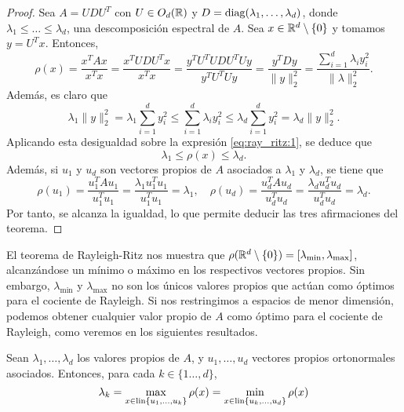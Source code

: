 \begin{proof}
    Sea $A = UDU^T$ con $U \in O_d(\mathbb{R})$ y $D = \operatorname{diag}(\lambda_1,\dots,\lambda_d)$, donde $\lambda_1 \le \dots \le \lambda_d$, una descomposición espectral de $A$. Sea $x \in \mathbb{R}^d \setminus \{0\}$ y tomamos $y = U^Tx$. Entonces,
    \begin{equation} \label{eq:ray_ritz:1}
        \rho(x) = \frac{x^TAx}{x^Tx} = \frac{x^TUDU^Tx}{x^Tx} = \frac{y^TU^TUDU^TUy}{y^TU^TUy} = \frac{y^TDy}{\|y\|^2_2} = \frac{\sum\limits_{i=1}^d \lambda_i y_i^2}{\|\lambda\|^2_2}. 
    \end{equation}
    Además, es claro que
    \[ \lambda_1\|y\|_2^2 = \lambda_1 \sum_{i=1}^d y_i^2 \le \sum_{i=1}^d \lambda_i y_i^2 \le \lambda_d \sum_{i=1}^d y_i^2 = \lambda_d\|y\|_2^2. \]
    Aplicando esta desigualdad sobre la expresión \ref{eq:ray_ritz:1}, se deduce que
    \[ \lambda_1 \le \rho(x) \le \lambda_d. \]
    Además, si $u_1$ y $u_d$ son vectores propios de $A$ asociados a $\lambda_1$ y $\lambda_d$, se tiene que
    \[ \rho(u_1) = \frac{u_1^TAu_1}{u_1^Tu_1} = \frac{\lambda_1 u_1^Tu_1}{u_1^Tu_1} = \lambda_1, \quad \rho(u_d) = \frac{u_d^TAu_d}{u_d^Tu_d} = \frac{\lambda_d u_d^Tu_d}{u_d^Tu_d} = \lambda_d.  \]
    Por tanto, se alcanza la igualdad, lo que permite deducir las tres afirmaciones del teorema.
\end{proof}

El teorema de Rayleigh-Ritz nos muestra que $\rho(\mathbb{R}^d \setminus \{0\}) = [\lambda_{\min}, \lambda_{\max}]$, alcanzándose un mínimo o máximo en los respectivos vectores propios. Sin embargo, $\lambda_{\min}$ y $\lambda_{\max}$ no son los únicos valores propios que actúan como óptimos para el cociente de Rayleigh. Si nos restringimos a espacios de menor dimensión, podemos obtener cualquier valor propio de $A$ como óptimo para el cociente de Rayleigh, como veremos en los siguientes resultados.

\begin{lem} \label{lem:courant_fischer}
    Sean $\lambda_1,\dots,\lambda_d$ los valores propios de $A$, y $u_1,\dots,u_d$ vectores propios ortonormales asociados. Entonces, para cada $k \in \{1\dots,d\}$,
    \begin{equation}
        \lambda_k = \max_{x \in \operatorname{lin}\{u_1,\dots,u_k\}} \rho(x) = \min_{x \in \operatorname{lin}\{u_k,\dots,u_{d}\}} \rho(x)
    \end{equation}
\end{lem}

